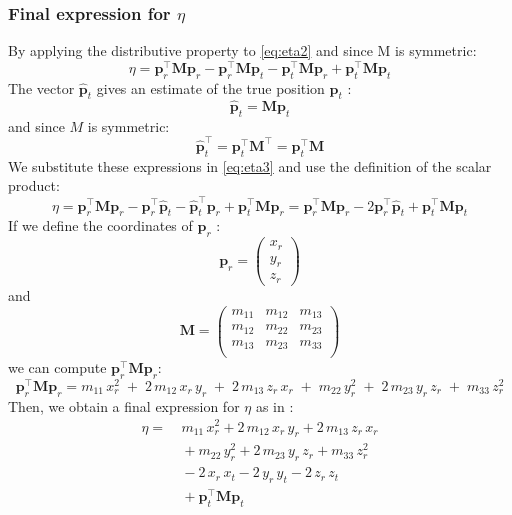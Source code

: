 \subsubsection{Final expression for $\eta$}
By applying the distributive property to \ref{eq:eta2} and since M is symmetric:
\begin{equation}
    \eta = \mathbf{p}_r^\top \mathbf{M} \mathbf{p}_r - \mathbf{p}_r^\top \mathbf{M} \mathbf{p}_t - \mathbf{p}_t^\top \mathbf{M} \mathbf{p}_r+ \mathbf{p}_t^\top \mathbf{M} \mathbf{p}_t
    \label{eq:eta3}
\end{equation}
The vector $\mathbf{\hat{p}}_t$ gives an estimate of the true position $\mathbf{p}_t$ :
\[
\mathbf{\hat{p}}_t = \mathbf{M} \mathbf{p}_t
\]
and since $M$ is symmetric:
\[
\mathbf{\hat{p}}_t^\top =  \mathbf{p}_t^\top \mathbf{M}^\top = \mathbf{p}_t^\top \mathbf{M}
\]
We substitute these expressions in \ref{eq:eta3} and use the definition of the scalar product:
\[
\eta = \mathbf{p}_r^\top \mathbf{M} \mathbf{p}_r - \mathbf{p}_r^\top \mathbf{\hat{p}}_t - \mathbf{\hat{p}}_t^\top \mathbf{p}_r+ \mathbf{p}_t^\top \mathbf{M} \mathbf{p}_r = \mathbf{p}_r^\top \mathbf{M} \mathbf{p}_r - 2 \mathbf{p}_r^\top \mathbf{\hat{p}}_t + \mathbf{p}_t^\top \mathbf{M} \mathbf{p}_t
\]
If we define the coordinates of $\mathbf{p}_r$ :
\[
\mathbf{p}_r = \begin{pmatrix}
    x_r \\
    y_r \\
    z_r
\end{pmatrix}
\]
and
\[
    \mathbf{M} = \begin{pmatrix}
    m_{11} & m_{12} & m_{13} \\
    m_{12} & m_{22} & m_{23} \\
    m_{13} & m_{23} & m_{33} \\
\end{pmatrix}
\]
we can compute $\mathbf{p}_r^\top \mathbf{M} \mathbf{p}_r$:
\[
\mathbf{p}_r^\top \mathbf{M} \mathbf{p}_r = 
m_{11} \, x_r^2 \; + \; 2 \, m_{12} \, x_r \, y_r \; + \; 2 \, m_{13} \, z_r \, x_r \; + \;
m_{22} \, y_r^2 \; + \; 2 \, m_{23} \, y_r \, z_r \; + \; m_{33} \, z_r^2
\]
Then, we obtain a final expression for $\eta$ as in \cite{main}:
\begin{equation}
\begin{aligned}
\eta = & \ m_{11} \, x_r^2 + 2 \, m_{12} \, x_r \, y_r + 2 \, m_{13} \, z_r \, x_r \\
       & \ + m_{22} \, y_r^2 + 2 \, m_{23} \, y_r \, z_r + m_{33} \, z_r^2 \\
       & \ - 2 \, x_r \, x_t - 2 \, y_r \, y_t - 2 \, z_r \, z_t \\
       & \ + \mathbf{p}_t^\top \mathbf{M} \mathbf{p}_t
\end{aligned}
\label{eq:eta_final}
\end{equation}

